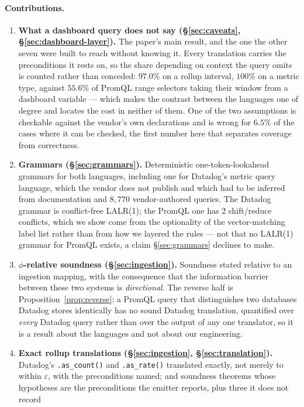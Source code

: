 \paragraph{Contributions.}
\begin{enumerate}
\item \textbf{What a dashboard query does not say (\S\ref{sec:caveats},
\S\ref{sec:dashboard-layer}).} The paper's main result, and the one the other seven were
built to reach without knowing it. Every translation carries the preconditions it rests
on, so the share depending on context the query omits is counted rather than conceded:
$97.0\%$ on a rollup interval, $100\%$ on a metric type, against $55.6\%$ of PromQL
range selectors taking their window from a dashboard variable --- which makes the
contrast between the languages one of degree and locates the cost in neither of them.
One of the two assumptions is checkable against the vendor's own declarations and is
wrong for $6.5\%$ of the cases where it can be checked, the first number here that
separates coverage from correctness.
\item \textbf{Grammars (\S\ref{sec:grammars}).} Deterministic one-token-lookahead
grammars for both languages, including one for Datadog's metric query language, which
the vendor does not publish and which had to be inferred from documentation and
$8{,}770$ vendor-authored queries. The Datadog grammar is conflict-free LALR(1); the
PromQL one has $2$ shift/reduce conflicts, which we show come from the optionality of
the vector-matching label list rather than from how we layered the rules --- not that no
LALR(1) grammar for PromQL exists, a claim \S\ref{sec:grammars} declines to make.
\item \textbf{$\phi$-relative soundness (\S\ref{sec:ingestion}).} Soundness stated
relative to an ingestion mapping, with the consequence that the information barrier
between these two systems is \emph{directional}. The reverse half is
Proposition~\ref{prop:reverse}: a PromQL query that distinguishes two databases Datadog
stores identically has no sound Datadog translation, quantified over \emph{every}
Datadog query rather than over the output of any one translator, so it is a result about
the languages and not about our engineering.
\item \textbf{Exact rollup translations (\S\ref{sec:ingestion}, \S\ref{sec:translation}).}
Datadog's \texttt{.as\_count()} and \texttt{.as\_rate()} translated exactly, not merely
to within $\varepsilon$, with the preconditions named; and soundness theorems whose
hypotheses are the preconditions the emitter reports, plus three it does not record

\end{enumerate}
